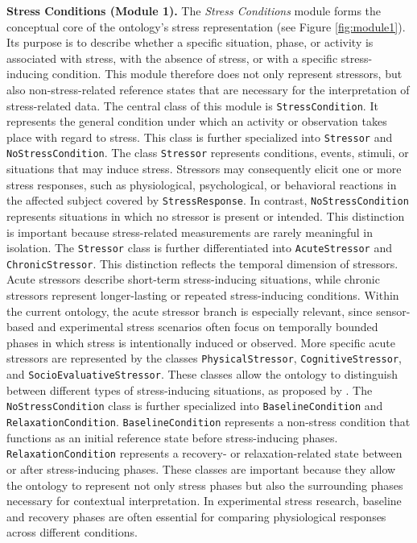 \documentclass[
]{ceurart}
\begin{document}
\textbf{Stress Conditions (Module 1).} The \textit{Stress Conditions} module forms the conceptual core of the ontology’s stress representation (see Figure \ref{fig:module1}). Its purpose is to describe whether a specific situation, phase, or activity is associated with stress, with the absence of stress, or with a specific stress-inducing condition. This module therefore does not only represent stressors, but also non-stress-related reference states that are necessary for the interpretation of stress-related data. The central class of this module is \texttt{StressCondition}. It represents the general condition under which an activity or observation takes place with regard to stress. This class is further specialized into \texttt{Stressor} and \texttt{NoStressCondition}. The class \texttt{Stressor} represents conditions, events, stimuli, or situations that may induce stress. Stressors may consequently elicit one or more stress responses, such as physiological, psychological, or behavioral reactions in the affected subject covered by \texttt{StressResponse}. In contrast, \texttt{NoStressCondition} represents situations in which no stressor is present or intended. This distinction is important because stress-related measurements are rarely meaningful in isolation. The \texttt{Stressor} class is further differentiated into \texttt{AcuteStressor} and \texttt{ChronicStressor}. This distinction reflects the temporal dimension of stressors. Acute stressors describe short-term stress-inducing situations, while chronic stressors represent longer-lasting or repeated stress-inducing conditions. Within the current ontology, the acute stressor branch is especially relevant, since sensor-based and experimental stress scenarios often focus on temporally bounded phases in which stress is intentionally induced or observed. More specific acute stressors are represented by the classes \texttt{PhysicalStressor}, \texttt{CognitiveStressor}, and \texttt{SocioEvaluativeStressor}. These classes allow the ontology to distinguish between different types of stress-inducing situations, as proposed by \cite{schmidt2019wearable}. The \texttt{NoStressCondition} class is further specialized into \texttt{BaselineCondition} and \texttt{RelaxationCondition}. \texttt{BaselineCondition} represents a non-stress condition that functions as an initial reference state before stress-inducing phases. \texttt{RelaxationCondition} represents a recovery- or relaxation-related state between or after stress-inducing phases. These classes are important because they allow the ontology to represent not only stress phases but also the surrounding phases necessary for contextual interpretation. In experimental stress research, baseline and recovery phases are often essential for comparing physiological responses across different conditions.
\end{document}
